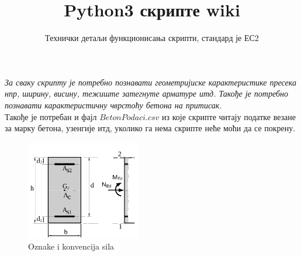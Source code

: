 \documentclass[11pt, a4paper]{article}
\begin{document}
\title{\vspace{-1cm}Python3 скрипте wiki}
\author{Технички детаљи функционисања скрипти, стандард је ЕС2}

\date{\vspace{-5ex}}
\maketitle

{\large \textit {За сваку скрипту је потребно познавати геометријиске карактеристике пресека нпр, ширину, висину, тежиште затегнуте арматуре итд. Такође је потребно познавати карактеристичну чврстоћу бетона на притисак.}}\\
Такође је потребан и фајл $BetonPodaci.csv$ из које скрипте читају податке везане за марку бетона, узенгије итд, уколико га нема скрипте неће моћи да се покрену.

\begin{center}
	\begin{figure}[h]
	\includegraphics[width=50mm, scale=1, center]{Konvencija.png}
	\caption{Oznake i konvencija sila}
	\end{figure}
\end{center}
\end{document}
